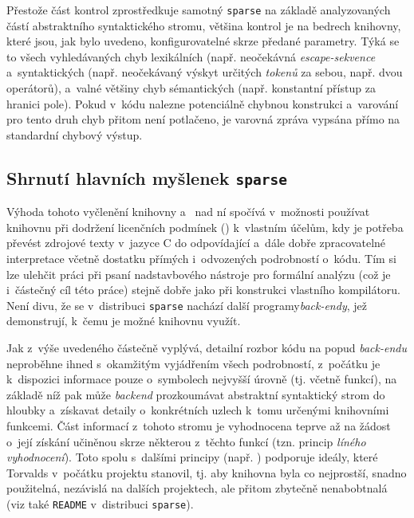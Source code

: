Přestože část kontrol zprostředkuje samotný \texttt{sparse} na základě
analyzovaných částí abstraktního syntaktického stromu, většina kontrol je na bedrech
knihovny, které jsou, jak bylo uvedeno, konfigurovatelné skrze předané
parametry. Týká se to všech vyhledávaných chyb lexikálních (např. neočekávná
\emph{escape-sekvence} a~syntaktických (např. neočekávaný výskyt
určitých \emph{tokenů} za sebou, např. dvou operátorů), a~valné většiny
chyb sémantických (např. konstantní přístup za hranici pole).
Pokud v~kódu nalezne potenciálně chybnou konstrukci a~varování pro tento
druh chyb přitom není potlačeno, je varovná zpráva vypsána přímo
na standardní chybový výstup.


\subsection{Shrnutí hlavních myšlenek \texttt{sparse}}

Výhoda tohoto vyčlenění knihovny a~ nad ní spočívá v~možnosti
používat  knihovnu při dodržení licenčních podmínek
()
k~vlastním účelům, kdy je potřeba převést zdrojové
texty v~jazyce C do odpovídající a~dále dobře zpracovatelné
interpretace včetně dostatku přímých i~odvozených
podrobností o~kódu. Tím si lze ulehčit práci při psaní nadstavbového
nástroje pro formální analýzu (což je i~částečný cíl této práce) stejně
dobře jako při konstrukci vlastního kompilátoru. Není divu, že se
v~distribuci \texttt{sparse} nachází další programy\ndash\emph{back-endy},
jež demonstrují, k~čemu je možné knihovnu využít.

Jak z~výše uvedeného částečně vyplývá, detailní rozbor kódu
na popud \emph{back-endu} neproběhne ihned s~okamžitým vyjádřením
všech podrobností, z~počátku je k~dispozici informace pouze o~symbolech
nejvyšší úrovně (tj. včetně funkcí), na základě níž pak může
\emph{backend} prozkoumávat abstraktní syntaktický strom do hloubky a~získavat
detaily o~konkrétních uzlech k~tomu určenými knihovními funkcemi.
Část informací z~tohoto stromu je vyhodnocena teprve až na žádost
o~její získání učiněnou skrze některou z~těchto funkcí
(tzn. princip \emph{líného vyhodnocení}). Toto spolu s~dalšími principy
(např. ) podporuje
ideály, které Torvalds v~počátku projektu stanovil, tj. aby
knihovna byla co nejprostší, snadno
použitelná, nezávislá na dalších projektech, ale přitom zbytečně
nenabobtnalá (viz také \texttt{README} v~distribuci \texttt{sparse}).


